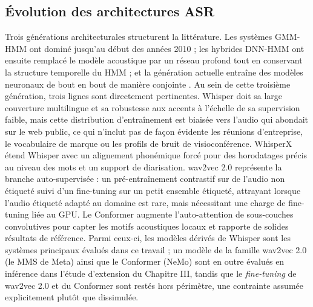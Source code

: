 \documentclass[12pt]{report}
\begin{document}
\subsection{Évolution des architectures ASR}
Trois générations architecturales structurent la littérature. Les systèmes GMM-HMM ont dominé jusqu'au début des années 2010 ; les hybrides DNN-HMM ont ensuite remplacé le modèle acoustique par un réseau profond tout en conservant la structure temporelle du HMM ; et la génération actuelle entraîne des modèles neuronaux de bout en bout de manière conjointe \cite{li2014overview,vaswani2017attention}. Au sein de cette troisième génération, trois lignes sont directement pertinentes. Whisper \cite{radford2023robust} doit sa large couverture multilingue et sa robustesse aux accents à l'échelle de sa supervision faible, mais cette distribution d'entraînement est biaisée vers l'audio qui abondait sur le web public, ce qui n'inclut pas de façon évidente les réunions d'entreprise, le vocabulaire de marque ou les profils de bruit de visioconférence. WhisperX \cite{bain2023whisperx} étend Whisper avec un alignement phonémique forcé pour des horodatages précis au niveau des mots et un support de diarisation. wav2vec 2.0 \cite{baevski2020wav2vec} représente la branche auto-supervisée : un pré-entraînement contrastif sur de l'audio non étiqueté suivi d'un fine-tuning sur un petit ensemble étiqueté, attrayant lorsque l'audio étiqueté adapté au domaine est rare, mais nécessitant une charge de fine-tuning liée au GPU. Le Conformer \cite{gulati2020conformer} augmente l'auto-attention de sous-couches convolutives pour capter les motifs acoustiques locaux et rapporte de solides résultats de référence. Parmi ceux-ci, les modèles dérivés de Whisper sont les systèmes principaux évalués dans ce travail ; un modèle de la famille wav2vec 2.0 (le MMS de Meta) ainsi que le Conformer (NeMo) sont en outre évalués en inférence dans l'étude d'extension du Chapitre III, tandis que le \emph{fine-tuning} de wav2vec 2.0 et du Conformer sont restés hors périmètre, une contrainte assumée explicitement plutôt que dissimulée.
\end{document}
